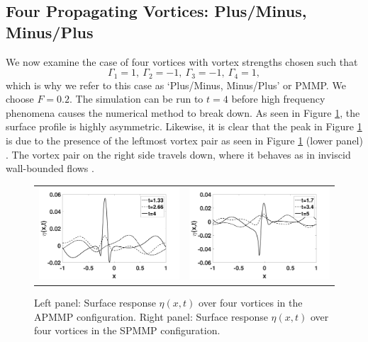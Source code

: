 \documentclass[a4paper,11pt]{article}
\begin{document}
\subsection{Four Propagating Vortices: Plus/Minus, Minus/Plus}
We now examine the case of four vortices with vortex strengths chosen such that
\[
\Gamma_{1}=1, ~ \Gamma_{2}=-1, ~ \Gamma_{3}=-1,~\Gamma_{4}=1,
\]
which is why we refer to this case as `Plus/Minus, Minus/Plus' or PMMP.  We choose $F=0.2$.  The simulation can be run to $t=4$ before high frequency phenomena causes the numerical method to break down.  As seen in Figure \ref{fig:surfreppmmp}, the surface profile is highly asymmetric.  Likewise, it is clear that the peak in Figure \ref{fig:surfreppmmp} is due to the presence of the leftmost vortex pair as seen in Figure \ref{fig:surfreppmmp} (lower panel)%
.  The vortex pair on the right side travels down, where it behaves as in inviscid wall-bounded flows \cite{lamb}.   
\begin{figure}[!h]
\centering
\begin{tabular}{cc}
\includegraphics[width=.5\textwidth]{surf_resp_mu_pt2_F_pt2_pmmp} & 
\includegraphics[width=.5\textwidth]{surf_resp_mu_pt2_F_pt2_pmmp_sym}
\end{tabular}
\caption{\small Left panel: Surface response $\eta(x,t)$ over four vortices in the APMMP configuration.
Right panel: Surface response $\eta(x,t)$ over four vortices in the SPMMP configuration.}
\label{fig:surfreppmmp}
\end{figure}
%
\end{document}
